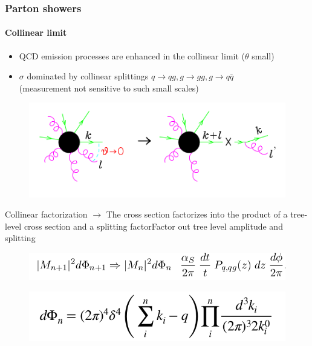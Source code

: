 \documentclass[aspectratio=43]{beamer}
\begin{document}
\begin{frame}

	\frametitle{Parton showers}
	\framesubtitle{Collinear limit}
	
	\begin{itemize} 
		\item \footnotesize QCD emission processes are enhanced in the collinear limit ($\theta$ small)
		\item \footnotesize $\sigma$ dominated by collinear splittings $q \rightarrow qg, g \rightarrow gg, g \rightarrow q\bar{q}$ \\
		(measurement not sensitive to such small scales)
	\end{itemize}
	
	\begin{figure}
		\includegraphics[width = 6 cm]{plots/collinear_factorization.png}
	\end{figure}
	
	\footnotesize Collinear factorization $\longrightarrow$ The cross section factorizes
	into the product of a tree-level cross section and a splitting
	factorFactor out tree level amplitude and splitting
	\begin{figure}
		\includegraphics[width = 7 cm]{plots/eq_factorization_theorem.png}
	\end{figure}

	\begin{figure}
		\includegraphics[width = 5 cm]{plots/eq_factorization_ps.png}
	\end{figure}

\end{frame}
\end{document}
